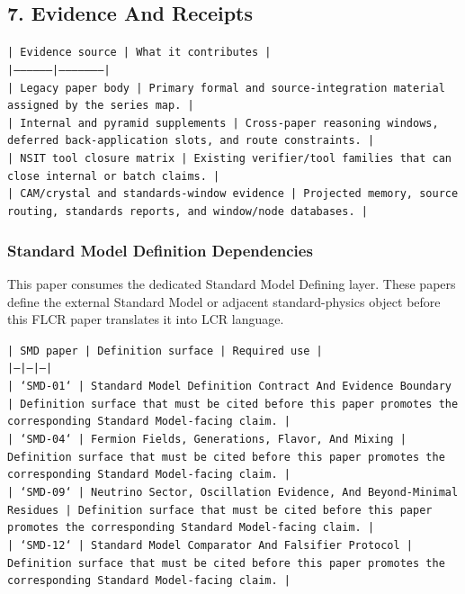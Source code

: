 \documentclass[11pt]{article}
\begin{document}
\subsection*{7. Evidence And Receipts}

\noindent\texttt{| Evidence source | What it contributes |}\\
\noindent\texttt{|-----------------|---------------------|}\\
\noindent\texttt{| Legacy paper body | Primary formal and source-integration material assigned by the series map. |}\\
\noindent\texttt{| Internal and pyramid supplements | Cross-paper reasoning windows, deferred back-application slots, and route constraints. |}\\
\noindent\texttt{| NSIT tool closure matrix | Existing verifier/tool families that can close internal or batch claims. |}\\
\noindent\texttt{| CAM/crystal and standards-window evidence | Projected memory, source routing, standards reports, and window/node databases. |}\\

\subsubsection*{Standard Model Definition Dependencies}

This paper consumes the dedicated Standard Model Defining layer. These papers define the external Standard Model or adjacent standard-physics object before this FLCR paper translates it into LCR language.

\noindent\texttt{| SMD paper | Definition surface | Required use |}\\
\noindent\texttt{|---|---|---|}\\
\noindent\texttt{| `SMD-01` | Standard Model Definition Contract And Evidence Boundary | Definition surface that must be cited before this paper promotes the corresponding Standard Model-facing claim. |}\\
\noindent\texttt{| `SMD-04` | Fermion Fields, Generations, Flavor, And Mixing | Definition surface that must be cited before this paper promotes the corresponding Standard Model-facing claim. |}\\
\noindent\texttt{| `SMD-09` | Neutrino Sector, Oscillation Evidence, And Beyond-Minimal Residues | Definition surface that must be cited before this paper promotes the corresponding Standard Model-facing claim. |}\\
\noindent\texttt{| `SMD-12` | Standard Model Comparator And Falsifier Protocol | Definition surface that must be cited before this paper promotes the corresponding Standard Model-facing claim. |}\\
\end{document}
